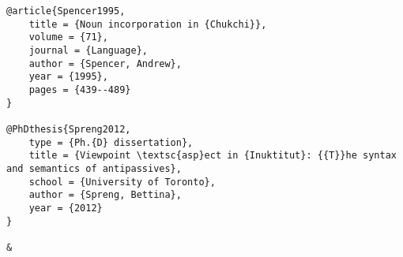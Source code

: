 \documentclass[output=paper,modfonts,nonflat,newtxmath]{langsci/langscibook}
\begin{document}
\begin{verbatim}
@article{Spencer1995,
	title = {Noun incorporation in {Chukchi}},
	volume = {71},
	journal = {Language},
	author = {Spencer, Andrew},
	year = {1995},
	pages = {439--489}
}

@PhDthesis{Spreng2012,
	type = {Ph.{D} dissertation},
	title = {Viewpoint \textsc{asp}ect in {Inuktitut}: {{T}}he syntax and semantics of antipassives},
	school = {University of Toronto},
	author = {Spreng, Bettina},
	year = {2012}
}

&\end{verbatim}
\sloppy\printbibliography[heading=subbibliography,notkeyword=this]
\end{document}

